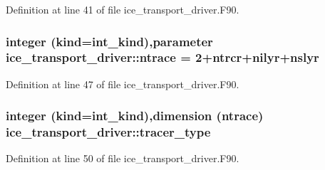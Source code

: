 Definition at line 41 of file ice\_\-transport\_\-driver.F90.\hypertarget{namespaceice__transport__driver_acd10161556f58f5f0de2dadd68565201}{
\subsubsection[{ntrace}]{\setlength{\rightskip}{0pt plus 5cm}integer (kind=int\_\-kind),parameter {\bf ice\_\-transport\_\-driver::ntrace} = 2+ntrcr+nilyr+nslyr}}
\label{namespaceice__transport__driver_acd10161556f58f5f0de2dadd68565201}


Definition at line 47 of file ice\_\-transport\_\-driver.F90.\hypertarget{namespaceice__transport__driver_a04137caf1a5335b66116ec171d0bfe44}{
\subsubsection[{tracer\_\-type}]{\setlength{\rightskip}{0pt plus 5cm}integer (kind=int\_\-kind),dimension ({\bf ntrace}) {\bf ice\_\-transport\_\-driver::tracer\_\-type}}}
\label{namespaceice__transport__driver_a04137caf1a5335b66116ec171d0bfe44}


Definition at line 50 of file ice\_\-transport\_\-driver.F90.